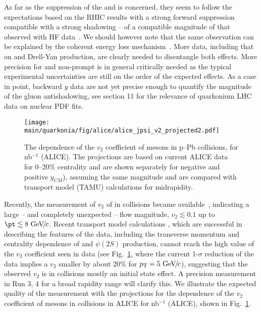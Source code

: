 \documentclass[../report.tex]{subfiles}
\providecommand{\main}{..}
\begin{document}
As far as the suppression of the  and \PJgy is concerned, they seem to follow the expectations based on the RHIC results with a strong forward suppression compatible with a strong shadowing -- of a compatible magnitude of that observed with HF data~\cite{Kusina:2017gkz}. We should however note that the same observation can be explained by the coherent energy loss mechanism~\cite{Arleo:2010rb}. More data, including that on \PGU and Drell-Yan production, are clearly needed to disentangle both effects. More precision for \PGU and non-prompt \PJgy is in general critically needed as the typical experimental uncertainties are still on the order of the expected effects. As a case in point, backward $y$ data are not yet precise enough to quantify the magnitude of the gluon antishadowing, see section 11 for the relevance of quarkonium \pPb LHC data on nuclear PDF fits.

\begin{figure}[h]
 \begin{center}
  \texttt{[image: \\main/quarkonia/fig/alice/alice\_jpsi\_v2\_projected2.pdf]}
 \end{center}
 \caption{The \pT dependence of the $v_2$ coefficient of \PJgy mesons in p--Pb collisions, for \unit[500]{nb}$^{-1}$ (ALICE). The projections are based on current ALICE data for 0--20\% centrality \cite{Acharya:2017tfn}  and are shown separately for negative and positive $y_{CM}$), assuming the same magnitude and are compared with transport model (TAMU) calculations \cite{Du:2018wsj} for midrapidity.}
\label{FigQ:v2pTpPb}
\end{figure}

Recently, the measurement of $v_2$ of \PJgy in \pPb collisions became available~\cite{Acharya:2017tfn,Sirunyan:2018kiz}, indicating a large -- and completely unexpected -- flow magnitude, $v_2 \lesssim 0.1$ up to $\pt \lesssim 8\UGeVc$.
Recent transport model calculations \cite{Du:2018wsj}, which are successful in describing the features of the data, including the transverse momentum and centrality dependence of  \PJgy  and $\psi(2S)$ production, cannot reach the high value of the $v_2$ coefficient seen in data \cite{Acharya:2017tfn,Sirunyan:2018kiz} (see Fig.~\ref{FigQ:v2pTpPb}, where the current 1-$\sigma$ reduction of the data implies a $v_2$ smaller by about 20\% for $p\sb{\scriptstyle\mathrm{T}}=5~\text{GeV}\!/\mspace{-2mu}c$), %
suggesting that the observed $v_2$ is in \pPb collisions mostly an initial state effect.
A precision measurement in Run 3, 4 for a broad rapidity range %
will clarify this.
We illustrate the expected quality of the measurement with the projections for the \pT dependence of the $v_2$ coefficient of \PJgy mesons in \pPb collisions in ALICE for \unit[500]{nb}$^{-1}$ (ALICE), shown in Fig.~\ref{FigQ:v2pTpPb}.
\end{document}
